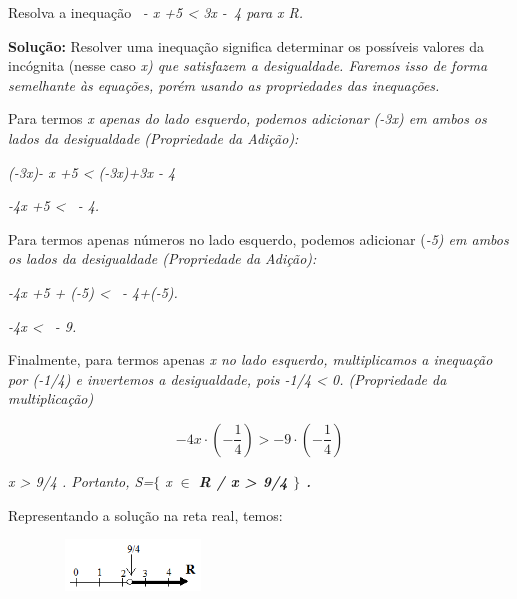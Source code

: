 \begin{texemplo}
Resolva a inequação~ \textit{- x +5 < 3x -~4  para x  R.}

\textbf{Solução:} Resolver uma inequação significa determinar os possíveis valores da incógnita (nesse caso \textit{x) que satisfazem a desigualdade. Faremos isso de forma semelhante às equações, porém usando as propriedades das inequações.}

Para termos \textit{x apenas do lado esquerdo, podemos adicionar (-3x) em ambos os lados da desigualdade (Propriedade da Adição):}

\textit{(-3x)- x +5 < (-3x)+3x - 4}

\textit{-4x +5 <~ - 4.}

Para termos apenas números no lado esquerdo, podemos adicionar (\textit{-5) em ambos os lados da desigualdade (Propriedade da Adição):}

\textit{-4x +5 + (-5) <~ - 4+(-5).}

\textit{-4x  <~ - 9.}

Finalmente, para termos apenas \textit{x no lado esquerdo, multiplicamos a inequação por (-1/4) e invertemos a desigualdade, pois -1/4 < 0. (Propriedade da multiplicação)}

 \[  \]  \[ -4x \cdot  \left( -\frac{1}{4} \right) > -9 \cdot  \left( -\frac{1}{4} \right)  \] 

\textit{x > 9/4 . Portanto, S=$ \{ $ x 	$\in$  \textbf{R / x > 9/4 $ \} $ .}}

Representando a solução na reta real, temos:\textit{}

\begin{figure}[H]
	\centering
		\includegraphics[width=1.77in,height=0.54in]{capitulos/inequacoes/media/image2.png}\qedsymbol{}
\end{figure}
\end{texemplo}


